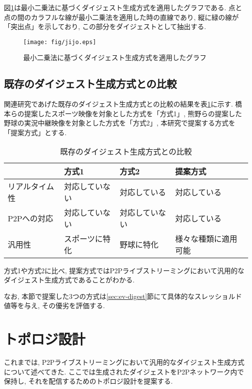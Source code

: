 図\ref{fig:jijo}は最小二乗法に基づくダイジェスト生成方式を適用したグラフである. 点と点の間のカラフルな線が最小二乗法を適用した時の直線であり, 縦に緑の線が「突出点」を示しており, この部分をダイジェストとして抽出する.

\begin{figure}[h]
  \centering
  \texttt{[image: fig/jijo.eps]}
  \caption{最小二乗法に基づくダイジェスト生成方式を適用したグラフ}
  \label{fig:jijo}
\end{figure}

\newpage

\subsection{既存のダイジェスト生成方式との比較}
関連研究であげた既存のダイジェスト生成方式との比較の結果を表\ref{tbl:compare-digest}に示す. 橋本らの提案したスポーツ映像を対象とした方式を「方式1」, 熊野らの提案した野球の実況中継映像を対象とした方式を「方式2」, 本研究で提案する方式を「提案方式」とする.

\begin{table}[h]
  \caption{既存のダイジェスト生成方式との比較}
  \label{tbl:compare-digest}
  \centering
      {\small
        \begin{tabular}{|l|l|l|l|}
          \hline
          & 方式1 & 方式2 & 提案方式 \\ \hline \hline
          リアルタイム性 & 対応していない & 対応している & 対応している \\ \hline
          P2Pへの対応 & 対応していない & 対応していない & 対応している \\ \hline
          汎用性 & スポーツに特化 & 野球に特化 & 様々な種類に適用可能 \\ \hline
        \end{tabular}
      }
\end{table}

方式1や方式2に比べ, 提案方式ではP2Pライブストリーミングにおいて汎用的なダイジェスト生成方式であることがわかる.

なお, 本節で提案した3つの方式は\ref{sec:ev-digest}節にて具体的なスレッショルド値等を与え, その優劣を評価する.

\newpage

\section{トポロジ設計}\label{sec:pro-topology}
これまでは, P2Pライブストリーミングにおいて汎用的なダイジェスト生成方式について述べてきた. ここでは生成されたダイジェストをP2Pネットワーク内で保持し, それを配信するためのトポロジ設計を提案する.

